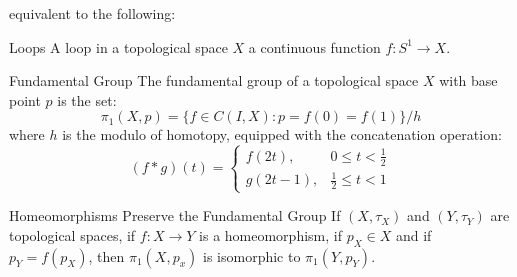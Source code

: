 \documentclass[crop=false,class=book,oneside]{standalone}
\begin{document}
            equivalent to the following:
            \begin{ldefinition}{Loops}
                A loop in a topological space $X$ a continuous function
                $f:S^{1}\rightarrow{X}$.
            \end{ldefinition}
            \begin{ldefinition}{Fundamental Group}
                The fundamental group of a topological space
                $X$ with base point $p$ is the set:
                \begin{equation}
                    \pi_{1}(X,p)=
                    \{f\in{C(I,X)}:p=f(0)=f(1)\}/h
                \end{equation}
                where $h$ is the modulo of homotopy,
                equipped with the concatenation operation:
                \begin{equation}
                    (f*g)(t)=
                    \begin{cases}
                        f(2t),&0\leq{t}<\frac{1}{2}\\
                        g(2t-1),&\frac{1}{2}\leq{t}<1
                    \end{cases}
                \end{equation}
            \end{ldefinition}
            \begin{ltheorem}{Homeomorphisms Preserve the Fundamental Group}
                If $(X,\tau_{X})$ and $(Y,\tau_{Y})$ are topological spaces,
                if $f:X\rightarrow{Y}$ is a homeomorphism, if $p_{X}\in{X}$ and
                if $p_{Y}=f(p_{X})$, then $\pi_{1}(X,p_{x})$ is isomorphic
                to $\pi_{1}(Y,p_{Y})$.
            \end{ltheorem}
\end{document}
